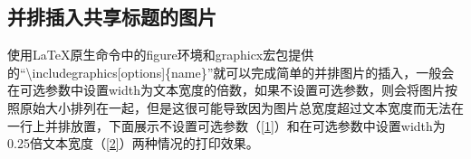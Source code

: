 \documentclass{article}
\begin{document}
\subsection{并排插入共享标题的图片}
    使用\LaTeX 原生命令中的figure环境和graphicx宏包提供的``\textbackslash includegraphics[options]\{name\}''就可以完成简单的并排图片的插入，一般会在可选参数中设置width为文本宽度的倍数，如果不设置可选参数，则会将图片按照原始大小排列在一起，但是这很可能导致因为图片总宽度超过文本宽度而无法在一行上并排放置，下面展示不设置可选参数（\ref{1}）和在可选参数中设置width为0.25倍文本宽度（\ref{2}）两种情况的打印效果。
\end{document}
